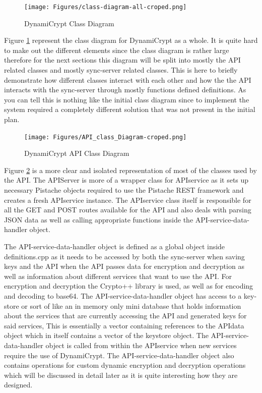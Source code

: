 \begin{figure}[!h]
  \centering
      \texttt{[image: Figures/class-diagram-all-croped.png]}
  \caption[DynamiCrypt Class Diagram]{DynamiCrypt Class Diagram}
  \label{fig:class-diagram-all}
\end{figure}
\FloatBarrier

Figure \ref{fig:class-diagram-all} represent the class diagram for DynamiCrypt as a whole. It is quite hard to make out the different elements since the class diagram is rather large therefore for the next sections this diagram will be split into mostly the API related classes and mostly sync-server related classes. This is here to briefly demonstrate how different classes interact with each other and how the the API interacts with the sync-server through mostly functions defined definitions. As you can tell this is nothing like the initial class diagram since to implement the system required a completely different solution that was not present in the initial plan.

\begin{figure}[!h]
  \centering
      \texttt{[image: Figures/API\_class\_Diagram-croped.png]}
  \caption[DynamiCrypt API Class Diagram]{DynamiCrypt API Class Diagram}
  \label{fig:API_class_Diagram}
\end{figure}
\FloatBarrier

Figure \ref{fig:API_class_Diagram} is a more clear and isolated representation of most of the classes used by the API. The APIServer is more of a wrapper class for APIservice as it sets up necessary Pistache objects required to use the Pistache REST framework and creates a fresh APIservice instance. 
The APIservice class itself is responsible for all the GET and POST routes available for the API and also deals with parsing JSON data as well as calling appropriate functions inside the API-service-data-handler object. 

The API-service-data-handler object is defined as a global object inside definitions.cpp as it needs to be accessed by both the sync-server when saving keys and the API when the API passes data for encryption and decryption as well as information about different services that want to use the API. For encryption and decryption the Crypto++ library is used, as well as for encoding and decoding to base64. The API-service-data-handler object has access to a key-store or sort of like an in memory only mini database that holds information about the services that are currently accessing the API and generated keys for said services, This is essentially a vector containing references to the APIdata object which in itself contains a vector of the keystore object. The API-service-data-handler object is called from within the APIservice when new services require the use of DynamiCrypt. The API-service-data-handler object also contains operations for custom dynamic encryption and decryption operations which will be discussed in detail later as it is quite interesting how they are designed. 

